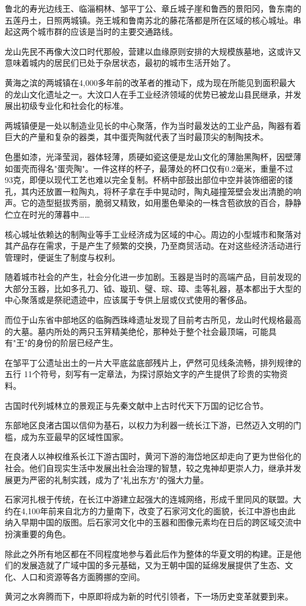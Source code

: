 鲁北的寿光边线王、临淄桐林、邹平丁公、章丘城子崖和鲁西的景阳冈，鲁东南的五莲丹土，日照两城镇。尧王城和鲁南苏北的藤花落都是所在区域的核心城址。串起这两个城市群的应该是当时的主要交通路线。

龙山先民不再像大汶口时代那般，营建以血缘原则安排的大规模族墓地，这或许又意味着城内的居民们已处于杂居状态，最初的城市生活开始了。

黄海之滨的两城镇在4,000多年前的改革者的推动下，成为现在所能见到面积最大的龙山文化遗址之一。大汶口人在手工业经济领域的优势已被龙山县民继承，并发展出初级专业化和社会化的标准。

两城镇便是一处以制造业见长的中心聚落，作为当时最发达的工业产品，陶器有着巨大的产量和复杂的器类，其中蛋壳陶就代表了当时最顶尖的制陶技术。

色墨如漆，光泽莹润，器体轻薄，质硬如瓷这便是龙山文化的薄胎黑陶杯，因壁薄如蛋壳而得名"蛋壳陶"。一件这样的杯子，最薄处的杯口仅有0.2毫米，重量不过93克，即便以现代工艺也难以完全复制。杯柄中部鼓出部位中空并装饰细密的镂孔，其内还放置一粒陶丸，将杯子拿在手中晃动时，陶丸碰撞笼壁会发出清脆的响声。它的造型挺拔秀丽，脆弱又精致，如用墨色晕染的一株含苞欲放的百合，静静伫立在时光的薄暮中……

核心城址依赖达的制陶业等手工业经济成为区域的中心。周边的小型城市和聚落对其产品存在需求，于是产生了频繁的交换，乃至商贸活动。在对这些经济活动进行管理时，便诞生了制度与权利。

随着城市社会的产生，社会分化进一步加剧。玉器是当时的高端产品，目前发现的大部分玉器，比如多孔刀、钺、璇玑、璧、琮、璋、圭等礼器，基本都出于大型的中心聚落或是祭祀遗迹中，应该属于专供上层或仪式使用的奢侈品。

而位于山东省中部地区的临胸西珠峰遗址发现了目前考古所见，龙山时代规格最高的大墓。墓内所处的两只玉笄精美绝伦，那种处于整个社会最顶端，可能具有"王"的身份的阶层已经产生。

在邹平丁公遗址出土的一片大平底盆底部残片上，俨然可见线条流畅，排列规律的五行 11个符号，刻写有一定章法，为探讨原始文字的产生提供了珍贵的实物资料。

古国时代列城林立的景观正与先秦文献中上古时代天下万国的记忆合节。

东部地区良渚古国以信仰为基石，以权力为利器一统长江下游，已然迈入文明的门槛，成为东亚最早的区域性国家。

在良渚人以神权维系长江下游古国时，黄河下游的海岱地区却走向了更为世俗化的社会。他们自现实生活中发展出社会治理的智慧，较之鬼神却更崇人力，继承并发展更为严密的礼制实践，成为了"礼出东方"的强大力量。

石家河扎根于传统，在长江中游建立起强大的连城网络，形成千里同风的联盟。大约在4,100年前来自北方的力量南下，改变了石家河文化的面貌，长江中游也由此纳入早期中国的版图。后石家河文化中的玉器和图像元素均在日后的跨区域交流中扮演重要的角色。

除此之外所有地区都在不同程度地参与着此后作为整体的华夏文明的构建。正是他们的发展造就了广域中国的多元基础，又为王朝中国的延绵发展提供了生态、文化、人口和资源等各方面腾挪的空间。

黄河之水奔腾而下，中原即将成为新的时代引领者，下一场历史变革就要到来。